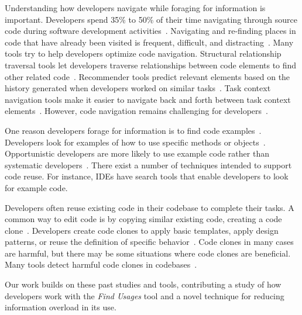\documentclass[conference]{IEEEtran}
\begin{document}
Understanding how developers navigate while foraging for information is important. Developers spend 35\% to 50\% of their time navigating through source code during software development activities~\cite{ko2006exploratory,piorkowski2013whats}. Navigating and re-finding places in code that have already been visited is frequent, difficult, and distracting~\cite{ko2005eliciting,deline2005towards}. Many tools try to help developers optimize code navigation. Structural relationship traversal tools let developers traverse relationships between code elements to find other related code~\cite{karrer2011stacksplorer,augustine2015field,latoza2011visualizing}. Recommender tools predict relevant elements based on the history generated when developers worked on similar tasks~\cite{zimmermann2005mining,deline2005easing}. Task context navigation tools make it easier to navigate back and forth between task context elements~\cite{ko2006exploratory}. However, code navigation remains challenging for developers~\cite{albusays2017interviews}.\par

One reason developers forage for information is to find code examples~\cite{rosson1996reuse, brandt2009two}. Developers look for examples of how to use specific methods or objects~\cite{stylos2006mica,umarji2008archetypal}. Opportunistic developers are more likely to use example code rather than systematic developers~\cite{head2018not}. There exist a number of techniques intended to support code reuse. For instance, IDEs have search tools that enable developers to look for example code.\par

Developers often reuse existing code in their codebase to complete their tasks. A common way to edit code is by copying similar existing code, creating a code clone~\cite{codeCloneDetection2019,hou2009cnp}. Developers create code clones to apply basic templates, apply design patterns, or reuse the definition of specific behavior~\cite{kim2004ethnographic,kapser2008cloning}.  Code clones in many cases are harmful, but there may be some situations where code clones are beneficial.  Many tools detect harmful code clones in codebases~\cite{bellon2007comparison}.\par

Our work builds on these past studies and tools, contributing a study of how developers work with the \textit{Find Usages} tool and a novel technique for reducing information overload in its use.

\end{document}
